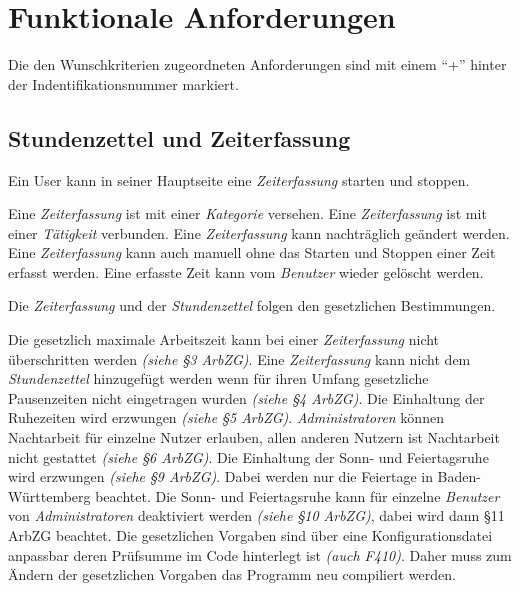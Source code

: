\section{Funktionale Anforderungen}

Die den Wunschkriterien zugeordneten Anforderungen sind mit einem "`+"' hinter der Indentifikationsnummer markiert.

\subsection{Stundenzettel und Zeiterfassung}

\begin{requirements}
    Ein User kann in seiner Hauptseite eine \emph{Zeiterfassung} starten und stoppen.
    \begin{requirements}
         Eine \emph{Zeiterfassung} ist mit einer \emph{Kategorie} versehen.
         Eine \emph{Zeiterfassung} ist mit einer \emph{Tätigkeit} verbunden.
         Eine \emph{Zeiterfassung} kann nachträglich geändert werden.
         Eine \emph{Zeiterfassung} kann auch manuell ohne das Starten und Stoppen einer Zeit erfasst werden.
         Eine erfasste Zeit kann vom \emph{Benutzer} wieder gelöscht werden.
    \end{requirements}

    Die \emph{Zeiterfassung} und der \emph{Stundenzettel} folgen den gesetzlichen Bestimmungen.
    \begin{requirements}
         Die gesetzlich maximale Arbeitszeit kann bei einer \emph{Zeiterfassung} nicht überschritten werden \emph{(siehe §3 ArbZG)}.
         Eine \emph{Zeiterfassung} kann nicht dem \emph{Stundenzettel} hinzugefügt werden wenn für ihren Umfang gesetzliche Pausenzeiten nicht eingetragen wurden \emph{(siehe §4 ArbZG)}.
         Die Einhaltung der Ruhezeiten wird erzwungen \emph{(siehe §5 ArbZG)}.
         \emph{Administratoren} können Nachtarbeit für einzelne Nutzer erlauben, allen anderen Nutzern ist Nachtarbeit nicht gestattet \emph{(siehe §6 ArbZG)}.
         Die Einhaltung der Sonn- und Feiertagsruhe wird erzwungen \emph{(siehe §9 ArbZG)}.
		Dabei werden nur die Feiertage in Baden-Württemberg beachtet.
                Die Sonn- und Feiertagsruhe kann für einzelne \emph{Benutzer} von \emph{Administratoren} deaktiviert werden \emph{(siehe §10 ArbZG)}, dabei wird dann §11 ArbZG beachtet.
         Die gesetzlichen Vorgaben sind über eine Konfigurationsdatei anpassbar deren Prüfsumme im Code hinterlegt ist \emph{(auch F410)}.
                Daher muss zum Ändern der gesetzlichen Vorgaben das Programm neu compiliert werden.
    \end{requirements}


\end{requirements}
